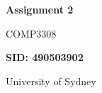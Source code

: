 \begin{titlepage}
    \begin{center}
        \vspace*{5cm}
            
        \Huge
        \textbf{Assignment 2}
            
        \vspace{0.5cm}
        \LARGE
        COMP3308
            
        \vspace{1.5cm}
            
        \textbf{SID: 490503902}
            
        \vfill
        
            
        \Large
        University of Sydney\\
            
    \end{center}
\end{titlepage}